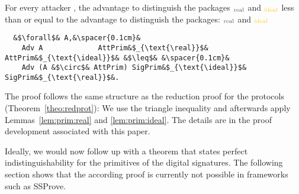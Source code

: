 %
\begin{theorem}\label{theo:redprim}
  For every attacker \A, the advantage to distinguish 
  the packages \pattprim$_{\text{\real}}$ and \pattprim$_{\text{\ideal}}$
  less than or equal to the advantage to distinguish 
  the packages: \psigprim$_{\text{\real}}$ and \psigprim$_{\text{\ideal}}$
  \begin{center}
      \begin{minipage}{0.8\columnwidth}
     \begin{verbatim}
  &$\forall$& A,&\spacer{0.1cm}& 
    Adv A             AttPrim&$_{\text{\real}}$& AttPrim&$_{\text{\ideal}}$& &$\leq$& &\spacer{0.1cm}&
    Adv (A &$\circ$& AttPrim) SigPrim&$_{\text{\ideal}}$& SigPrim&$_{\text{\real}}$&.
    \end{verbatim}
     \end{minipage}
  \end{center}
\end{theorem}
%
\begin{IEEEproof}
    The proof follows the same structure as the reduction proof for the 
    protocols (Theorem~\ref{theo:redprot}):
    We use the triangle inequality and afterwards apply 
    Lemmas~\ref{lem:prim:real} and \ref{lem:prim:ideal}.
    The details are in the proof development associated with this paper.
\end{IEEEproof}
%
Ideally, we would now follow up with a theorem that
states perfect indistinguishability for the primitives of
the digital signatures.
%
The following section shows that the according proof is
currently not possible in frameworks such as SSProve.
%
